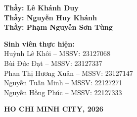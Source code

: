 \begin{titlepage}
\begin{center}
    
    \vspace{1.5cm}

    \begin{tcolorbox}[colback=blue!5!white, colframe=blue!50!black, width=0.9\textwidth, boxrule=0.8pt, arc=3pt, left=8pt, right=8pt]
        \textbf{Thầy: Lê Khánh Duy}\\
        \textbf{Thầy: Nguyễn Huy Khánh}\\
        \textbf{Thầy: Phạm Nguyễn Sơn Tùng}
    \end{tcolorbox}
    \vspace{1cm}

    \begin{tcolorbox}[colback=gray!10!white, colframe=gray!60!black, width=0.9\textwidth, boxrule=0.8pt, arc=3pt, left=8pt, right=8pt]
        \textbf{Sinh viên thực hiện:} \\
        Huỳnh Lê Khôi -- MSSV: 23127068 \\ 
        Bùi Đức Đạt -- MSSV: 23127337 \\
        Phan Thị Hương Xuân -- MSSV: 23127147 \\
        Nguyễn Tuấn Minh -- MSSV: 22127271 \\
        Nguyễn Hồng Phúc -- MSSV: 22127333
        
    \end{tcolorbox}

    \vfill
    {\large\textbf{HO CHI MINH CITY, 2026}}
\end{center}
\end{titlepage}
